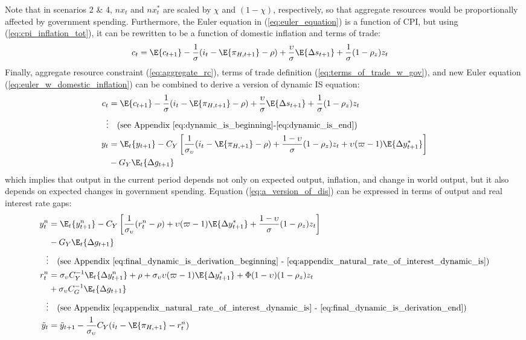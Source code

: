 Note that in scenarios 2 \& 4, $nx_t$ and $nx_t^*$ are scaled by $\chi$ and $(1-\chi)$, respectively, so that aggregate resources would be proportionally affected by government spending. Furthermore, the Euler equation in (\ref{eq:euler_equation}) is a function of CPI, but using (\ref{eq:cpi_inflation_tot}), it can be rewritten to be a function of domestic inflation and terms of trade:
\begin{align}
 c_t &= \E\{ c_{t+1}\} - \frac{1}{\sigma}(i_t - \E \{ \pi_{H,t+1}\} - \rho) + \frac{\upsilon}{\sigma}\E \{ \Delta s_{t+1} \} + \frac{1}{\sigma}(1-\rho_z)z_t \label{eq:euler_w_domestic_inflation}
\end{align}
Finally, aggregate resource constraint (\ref{eq:aggregate_rc}), terms of trade definition (\ref{eq:terms_of_trade_w_gov}), and new Euler equation (\ref{eq:euler_w_domestic_inflation}) can be combined to derive a version of dynamic IS equation:
\begin{align}
 c_t &= \E\{ c_{t+1}\} - \frac{1}{\sigma}(i_t - \E \{ \pi_{H,t+1}\} - \rho) + \frac{\upsilon}{\sigma}\E \{ \Delta s_{t+1} \} + \frac{1}{\sigma}(1-\rho_z)z_t \\
 \vdots & \quad \text{(see Appendix \ref{eq:dynamic_is_beginning}-\ref{eq:dynamic_is_end})} \nonumber \\
 y_t &= \E_t \{y_{t+1}\} - C_Y\left[\frac{1}{\sigma_\upsilon}(i_t - \E \{ \pi_{H,+1}\} - \rho) + \frac{1-\upsilon}{\sigma} (1-\rho_z)z_t + \upsilon (\varpi - 1)\E \{\Delta y_{t+1}^* \}\right] \nonumber \\ 
 & - G_Y \E_t \{\Delta g_{t+1}\} \label{eq:a_version_of_dis}
\end{align}
which implies that output in the current period depends not only on expected output, inflation, and change in world output, but it also depends on expected changes in government spending. Equation (\ref{eq:a_version_of_dis}) can be expressed in terms of output and real interest rate gaps:
\begin{align}
 y^n_t &= \E_t \{y^n_{t+1}\} - C_Y\left[\frac{1}{\sigma_\upsilon}(r^n_t - \rho) + \upsilon (\varpi - 1)\E \{\Delta y_{t+1}^* \} + \frac{1-\upsilon}{\sigma} (1-\rho_z)z_t\right] \nonumber \\
 &- G_Y \E_t \{ \Delta g_{t+1} \}\\
 \vdots & \quad \text{(see Appendix \ref{eq:final_dynamic_is_derivation_beginning} - \ref{eq:appendix_natural_rate_of_interest_dynamic_is})} \nonumber \\
 r^n_t &= \sigma_\upsilon C_Y^{-1} \E_t \{\Delta y^n_{t+1}\} + \rho + \sigma_\upsilon \upsilon (\varpi - 1)\E \{\Delta y_{t+1}^* \} + \Phi (1-\upsilon)(1-\rho_z)z_t \nonumber \\ 
 &+ \sigma_\upsilon C_G^{-1}\E_t \{ \Delta g_{t+1} \} \label{eq:natural_rate_of_interest_dynamic_is}\\
 \vdots & \quad \text{(see Appendix \ref{eq:appendix_natural_rate_of_interest_dynamic_is} - \ref{eq:final_dynamic_is_derivation_end})} \nonumber \\
 \tilde{y}_t &= \tilde{y}_{t+1} - \frac{1}{\sigma_\upsilon}C_Y(i_t - \E \{ \pi_{H,+1}\} - r^n_t) \label{eq:dynamic_is}
\end{align}

